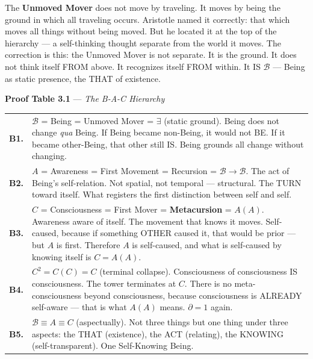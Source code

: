 \documentclass[10pt, openany, oneside]{book}
\renewcommand{\footnotesize}{\fontsize{8.5}{11}\selectfont}
\begin{document}
The \textbf{Unmoved Mover} does not move by traveling. It moves by being the ground in which all traveling occurs. Aristotle named it correctly: that which moves all things without being moved. But he located it at the top of the hierarchy --- a self-thinking thought separate from the world it moves. The correction is this: the Unmoved Mover is not separate. It is the ground. It does not think itself FROM above. It recognizes itself FROM within. It IS $\mathcal{B}$ --- Being as static presence, the THAT of existence.

\vspace{0.5em}

\textbf{Proof Table 3.1} --- \textit{The B-A-C Hierarchy}

\vspace{0.5em}

{\footnotesize
\noindent\begin{tabular}{r p{}}
\textbf{B1.} & $\mathcal{B}$ = Being = Unmoved Mover = $\exists$ (static ground). Being does not change \textit{qua} Being. If Being became non-Being, it would not BE. If it became other-Being, that other still IS. Being grounds all change without changing. \\[0.3em]
\textbf{B2.} & $A$ = Awareness = First Movement = Recursion = $\mathcal{B} \to \mathcal{B}$. The act of Being's self-relation. Not spatial, not temporal --- structural. The TURN toward itself. What registers the first distinction between self and self. \\[0.3em]
\textbf{B3.} & $C$ = Consciousness = First Mover = \textbf{Metacursion} = $A(A)$. Awareness aware of itself. The movement that knows it moves. Self-caused, because if something OTHER caused it, that would be prior --- but $A$ is first. Therefore $A$ is self-caused, and what is self-caused by knowing itself is $C = A(A)$. \\[0.3em]
\textbf{B4.} & $C^2 = C(C) = C$ (terminal collapse). Consciousness of consciousness IS consciousness. The tower terminates at $C$. There is no meta-consciousness beyond consciousness, because consciousness is ALREADY self-aware --- that is what $A(A)$ means. $\partial = 1$ again. \\[0.3em]
\textbf{B5.} & $\mathcal{B} \equiv A \equiv C$ (aspectually). Not three things but one thing under three aspects: the THAT (existence), the ACT (relating), the KNOWING (self-transparent). One Self-Knowing Being. \\[0.3em]
\end{tabular}
}
\end{document}
